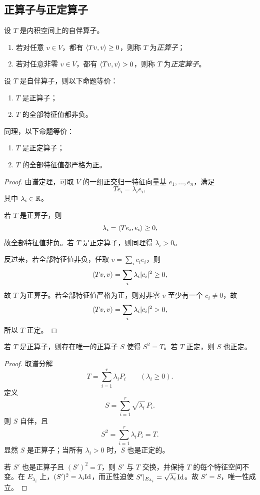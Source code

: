 \subsection{正算子与正定算子}

\begin{definition}
设 $T$ 是内积空间上的自伴算子。
\begin{enumerate}[label=\textnormal{(\arabic*)}]
  \item 若对任意 $v\in V$，都有 $\langle Tv, v \rangle\ge 0$，则称 $T$ 为\emph{正算子}；
  \item 若对任意非零 $v\in V$，都有 $\langle Tv, v \rangle>0$，则称 $T$ 为\emph{正定算子}。
\end{enumerate}
\end{definition}

\begin{proposition}
设 $T$ 是自伴算子，则以下命题等价：
\begin{enumerate}[label=\textnormal{(\arabic*)}]
  \item $T$ 是正算子；
  \item $T$ 的全部特征值都非负。
\end{enumerate}
同理，以下命题等价：
\begin{enumerate}[label=\textnormal{(\arabic*)},start=3]
  \item $T$ 是正定算子；
  \item $T$ 的全部特征值都严格为正。
\end{enumerate}
\end{proposition}

\begin{proof}
由谱定理，可取 $V$ 的一组正交归一特征向量基 $e_1,\dots,e_n$，满足
\[
Te_i=\lambda_i e_i,
\]
其中 $\lambda_i\in\mathbb{R}$。

若 $T$ 是正算子，则
\[
\lambda_i=\langle Te_i, e_i \rangle\ge 0,
\]
故全部特征值非负。若 $T$ 是正定算子，则同理得 $\lambda_i>0$。

反过来，若全部特征值非负，任取 $v=\sum_i c_ie_i$，则
\[
\langle Tv, v \rangle=\sum_i \lambda_i|c_i|^2\ge 0,
\]
故 $T$ 为正算子。若全部特征值严格为正，则对非零 $v$ 至少有一个 $c_i\ne0$，故
\[
\langle Tv, v \rangle=\sum_i \lambda_i|c_i|^2>0,
\]
所以 $T$ 正定。
\end{proof}

\begin{corollary}[正平方根]
若 $T$ 是正算子，则存在唯一的正算子 $S$ 使得 $S^2=T$。若 $T$ 正定，则 $S$ 也正定。
\end{corollary}

\begin{proof}
取谱分解
\[
T=\sum_{i=1}^r \lambda_iP_i\qquad (\lambda_i\ge 0).
\]
定义
\[
S=\sum_{i=1}^r \sqrt{\lambda_i}\,P_i.
\]
则 $S$ 自伴，且
\[
S^2=\sum_{i=1}^r \lambda_iP_i=T.
\]
显然 $S$ 是正算子；当所有 $\lambda_i>0$ 时，$S$ 也是正定的。

若 $S'$ 也是正算子且 $(S')^2=T$，则 $S'$ 与 $T$ 交换，并保持 $T$ 的每个特征空间不变。在 $E_{\lambda_i}$ 上，$(S')^2=\lambda_i\mathrm{Id}$，而正性迫使 $S'|_{E_{\lambda_i}}=\sqrt{\lambda_i}\,\mathrm{Id}$。故 $S'=S$，唯一性成立。
\end{proof}

